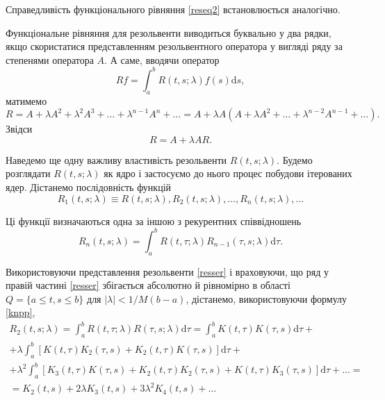 \documentclass[14pt,twoside]{extreport}
\theoremstyle{mystyle}
\numberwithin{equation}{chapter}
\begin{document}
Справедливість функціонального рівняння \eqref{reseq2} встановлюється аналогічно.

Функціональне рівняння для резольвенти виводиться буквально у два рядки, якщо скористатися представленням резольвентного оператора у вигляді ряду за степенями оператора $A$. А саме, вводячи оператор
\[
 Rf = \int_{a}^{b} R(t, s; \lambda) f(s) \mathrm{d}s,
\]
матимемо
\[
 R=A+\lambda A^2 + \lambda^2 A^3 + \ldots + \lambda^{n-1}A^n+\ldots=A+\lambda A (A+\lambda A^2 + \ldots + \lambda^{n-2}A^{n-1}+\ldots).
\]
Звідси
\[
 R = A+\lambda A R.
\]


Наведемо ще одну важливу властивість резольвенти $R(t, s; \lambda)$. Будемо розглядати $R(t, s; \lambda)$ як ядро і застосуємо до нього процес побудови ітерованих ядер. Дістанемо послідовність функцій
\[
 R_1(t, s; \lambda) \equiv R(t, s; \lambda), R_2(t, s; \lambda), \ldots, R_n(t, s; \lambda), \ldots
\]

Ці функції визначаються одна за іншою з рекурентних співвідношень
\begin{equation}
 R_n(t, s; \lambda) = \int_{a}^{b} R(t, \tau; \lambda) R_{n-1}(\tau, s; \lambda) \mathrm{d}\tau.
\end{equation}

Використовуючи представлення резольвенти \eqref{resser} і враховуючи, що ряд у правій частині \eqref{resser} збігається абсолютно й рівномірно в області $Q=\{a \leqslant t,s \leqslant b\}$ для $|\lambda|< 1/M(b-a)$, дістанемо, використовуючи формулу \eqref{knpp},
\begin{multline*}
  R_2(t, s; \lambda) = \displaystyle\int_{a}^{b} R(t, \tau; \lambda) R(\tau, s; \lambda) \mathrm{d}\tau =\int_{a}^{b} K(t, \tau) K(\tau, s) \mathrm{d}\tau +\\
  \displaystyle+ \lambda \int_{a}^{b} \left[K(t, \tau) K_2(\tau, s) + K_2(t, \tau) K(\tau, s)\right] \mathrm{d}\tau +\\
  \displaystyle+ \lambda^2 \int_{a}^{b} \left[K_3(t, \tau) K(\tau, s) + K_2(t, \tau) K_2(\tau, s) + K(t, \tau) K_3(\tau, s)\right] \mathrm{d}\tau +\ldots =\\
  \displaystyle= K_2(t, s) + 2\lambda K_3(t, s) +3\lambda^2 K_4(t, s) + \ldots
\end{multline*}
\end{document}
